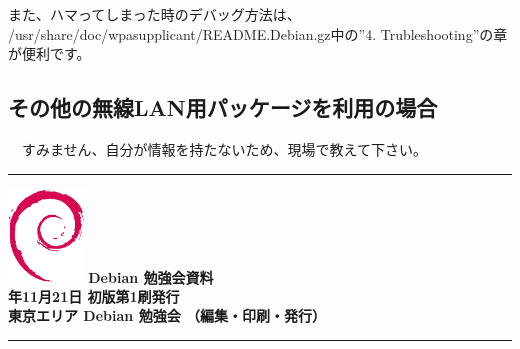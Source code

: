 \documentclass[mingoth,a4paper]{jsarticle}
\newcommand{\debmtgyear}{2015}
\newcommand{\debmtgmonth}{11}
\newcommand{\debmtgdate}{21}
\begin{document}
 また、ハマってしまった時のデバッグ方法は、
/usr/share/doc/wpasupplicant/README.Debian.gz中の''4. Trubleshooting''の章が便利です。

 \subsection{その他の無線LAN用パッケージを利用の場合}

　すみません、自分が情報を持たないため、現場で教えて下さい。

\cleartooddpage

\vspace*{15cm}
\hrule
\vspace{2mm}
\includegraphics[width=2cm]{image200502/openlogo-nd.eps}
\noindent \Large \bf Debian 勉強会資料\\
\noindent \normalfont \debmtgyear{}年\debmtgmonth{}月\debmtgdate{}日 \hspace{5mm}  初版第1刷発行\\
\noindent \normalfont 東京エリア Debian 勉強会 （編集・印刷・発行）\\
\hrule
\end{document}
